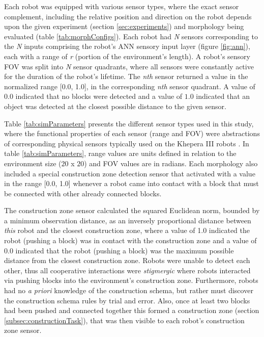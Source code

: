 \documentclass[conference]{IEEEtran}
\begin{document}
Each robot was equipped with various sensor types, where the exact sensor complement, including the
relative position and direction on the robot depends upon the given experiment
(section \ref{sec:experiments}) and morphology being evaluated (table \ref{tab:morphConfigs}).
Each robot had \textit{N} sensors corresponding to the \textit{N} inputs comprising the robot's
ANN sensory input layer (figure \ref{fig:ann}), each with a range of \textit{r}
(portion of the environment's length).
A robot's sensory FOV was split into \textit{N} sensor quadrants, where all sensors were constantly active
for the duration of the robot's lifetime.
The \textit{nth} sensor returned a value in the normalized range [0.0, 1.0],
in the corresponding \textit{nth} sensor quadrant.
A value of $0.0$ indicated that no blocks were detected and a value of $1.0$ indicated that an object was detected
at the closest possible distance to the given sensor.

Table \ref{tab:simParameters} presents the different sensor types used in this study, where the functional properties of each sensor
(range and FOV) were abstractions of corresponding physical sensors typically used on the Khepera III robots \cite{khepera3usermanual2013}.
In table \ref{tab:simParameters}, range values are units defined in relation to the environment size ($20$ x $20$)
and FOV values are in radians.
Each morphology also included a special construction zone detection sensor that activated with a value in the range
[0.0, 1.0] whenever a robot came into
contact with a block that must be connected with other already connected blocks.

The construction zone sensor calculated the squared Euclidean norm, bounded by a minimum observation distance, as an
inversely proportional distance between \textit{this} robot and the closest construction zone, where a value of 1.0 indicated the robot (pushing a block)
was in contact with the construction zone and a value of 0.0 indicated that the robot (pushing a block) was the maximum possible
distance from the closest construction zone.
Robots were unable to detect each other, thus all cooperative interactions were \textit{stigmergic} \cite{BeckersHollandDeneubourg1994}
where robots interacted via pushing blocks into the environment's construction zone.
Furthermore, robots had no \textit{a priori} knowledge of the construction schema,
but rather must discover the construction schema rules by trial and error.
Also, once at least two blocks had been pushed and connected together this formed a construction zone (section \ref{subsec:constructionTask}),
that was then visible to each robot's construction zone sensor.
\end{document}
